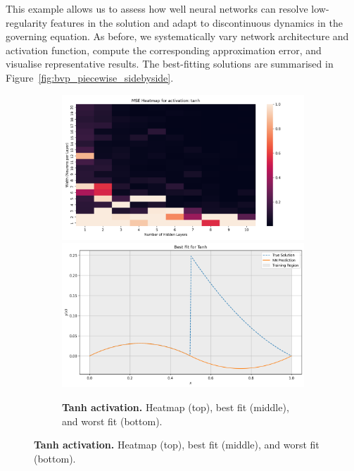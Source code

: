 This example allows us to assess how well neural networks can resolve low-regularity features in 
the solution and adapt to discontinuous dynamics in the governing equation. As before, we 
systematically vary network architecture and activation function, compute the corresponding 
approximation error, and visualise representative results. The best-fitting solutions are 
summarised in Figure~\ref{fig:bvp_piecewise_sidebyside}.

\begin{figure}[h]
    \centering
    \hspace*{\fill}
    \begin{subfigure}[t]{0.48\textwidth}
        \centering
        \includegraphics[width=\textwidth]{graphics/mse_heatmap_bvp_piecewise_tanh.png}
        \includegraphics[width=\textwidth]{graphics/bvp_piecewise_best_fit_tanh_10layers_13width.png}
        \caption{\textbf{Tanh activation.} Heatmap (top), best fit (middle), and worst fit (bottom).}
        \label{fig:ivp_periodic_tanh}
    \end{subfigure}

\end{figure}

